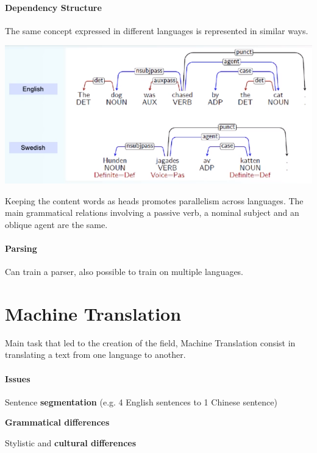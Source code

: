 \documentclass[10pt]{report}
\begin{document}
\paragraph{Dependency Structure} The same concept expressed in different languages is represented in similar ways.
\begin{center}
	\includegraphics[scale=0.5]{40.png}
\end{center}
Keeping the content words as heads promotes parallelism across languages. The main grammatical relations involving a passive verb, a nominal subject and an oblique agent are the same.
\paragraph{Parsing}
Can train a parser, also possible to train on multiple languages.
\section{Machine Translation}
Main task that led to the creation of the field, Machine Translation consist in translating a text from one language to another.
\paragraph{Issues}
\begin{list}{}{}
	\item Sentence \textbf{segmentation} (e.g. 4 English sentences to 1 Chinese sentence)
	\item \textbf{Grammatical differences}
	\item Stylistic and \textbf{cultural differences} 
\end{list}
\end{document}
